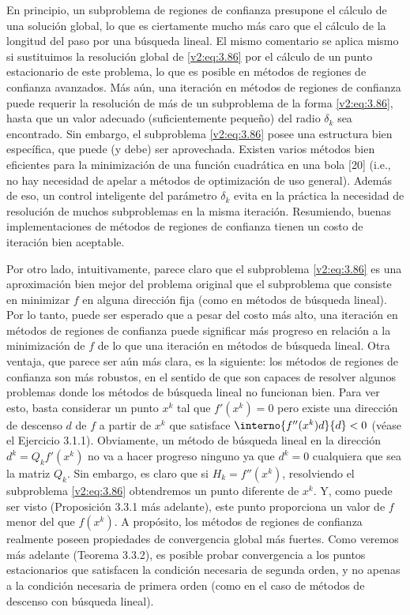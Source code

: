 En principio, un subproblema de regiones de confianza presupone el cálculo de una solución global, lo que es ciertamente mucho más caro que el cálculo de la longitud del paso por una búsqueda lineal. El mismo comentario se aplica mismo si sustituimos la resolución global de \eqref{v2:eq:3.86} por el cálculo de un punto estacionario de este problema, lo que es posible en métodos de regiones de confianza avanzados. Más aún, una iteración en métodos de regiones de confianza puede requerir la resolución de más de un subproblema de la forma \eqref{v2:eq:3.86}, hasta que un valor adecuado (suficientemente pequeño) del radio $\delta_k$ sea encontrado. Sin embargo, el subproblema \eqref{v2:eq:3.86} posee una estructura bien específica, que puede (y debe) ser aprovechada. Existen varios métodos bien eficientes para la minimización de una función cuadrática en una bola [20] (i.e., no hay necesidad de apelar a métodos de optimización de uso general). Además de eso, un control inteligente del parámetro $\delta_k$ evita en la práctica la necesidad de resolución de muchos subproblemas en la misma iteración. Resumiendo, buenas implementaciones de métodos de regiones de confianza tienen un costo de iteración bien aceptable.

Por otro lado, intuitivamente, parece claro que el subproblema \eqref{v2:eq:3.86} es una aproximación bien mejor del problema original que el subproblema que consiste en minimizar $f$ en alguna dirección fija (como en métodos de búsqueda lineal). Por lo tanto, puede ser esperado que a pesar del costo más alto, una iteración en métodos de regiones de confianza puede significar más progreso en relación a la minimización de $f$ de lo que una iteración en métodos de búsqueda lineal. Otra ventaja, que parece ser aún más clara, es la siguiente: los métodos de regiones de confianza son más robustos, en el sentido de que son capaces de resolver algunos problemas donde los métodos de búsqueda lineal no funcionan bien. Para ver esto, basta considerar un punto $x^k$ tal que $f'(x^k) = 0$ pero existe una dirección de descenso $d$ de $f$ a partir de $x^k$ que satisface $\interno{f''(x^k)d}{d} < 0$ (véase el Ejercicio 3.1.1). Obviamente, un método de búsqueda lineal en la dirección $d^k = Q_k f'(x^k)$ no va a hacer progreso ninguno ya que $d^k = 0$ cualquiera que sea la matriz $Q_k$. Sin embargo, es claro que si $H_k = f''(x^k)$, resolviendo el subproblema \eqref{v2:eq:3.86} obtendremos un punto diferente de $x^k$. Y, como puede ser visto (Proposición 3.3.1 más adelante), este punto proporciona un valor de $f$ menor del que $f(x^k)$. A propósito, los métodos de regiones de confianza realmente poseen propiedades de convergencia global más fuertes. Como veremos más adelante (Teorema 3.3.2), es posible probar convergencia a los puntos estacionarios que satisfacen la condición necesaria de segunda orden, y no apenas a la condición necesaria de primera orden (como en el caso de métodos de descenso con búsqueda lineal).

